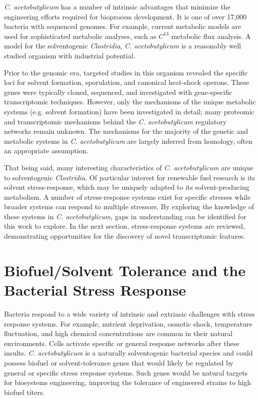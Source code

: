 \textit{C. acetobutylicum} has a number of intrinsic advantages that minimize the engineering efforts required for bioprocess development. It is one of over 17,000 bacteria with sequenced genomes.\cite{89,90,91} For example, current metabolic models\cite{100} are used for sophisticated metabolic analyses, such as $C^{13}$ metabolic flux analysis.\cite{99} A model for the solventogenic \textit{Clostridia}, \textit{C. acetobutylicum} is a reasonably well studied organism with industrial potential.

Prior to the genomic era, targeted studies in this organism revealed the specific loci for solvent formation,\cite{62,63,64,66,68,72,73} sporulation,\cite{125} and canonical heat-shock operons.\cite{76,80} These genes were typically cloned, sequenced, and investigated with gene-specific transcriptomic techniques. However, only the mechanisms of the unique metabolic systems (e.g. solvent formation) have been investigated in detail; many proteomic and transcriptomic mechanisms behind the \textit{C. acetobutylicum} regulatory networks remain unknown.\cite{126,42} The mechanisms for the majority of the genetic and metabolic systems in \textit{C. acetobutylicum} are largely inferred from homology, often an appropriate assumption.

That being said, many interesting characteristics of \textit{C. acetobutylicum} are unique to solventogenic \textit{Clostridia}. Of particular interest for renewable fuel research is its solvent stress-response, which may be uniquely adapted to its solvent-producing metabolism. A number of stress-response systems exist for specific stresses while broader systems can respond to multiple stressors. By exploring the knowledge of these systems in \textit{C. acetobutylicum}, gaps in understanding can be identified for this work to explore. In the next section, stress-response systems are reviewed, demonstrating opportunities for the discovery of novel transcriptomic features.

\section{Biofuel/Solvent Tolerance and the Bacterial Stress Response}


Bacteria respond to a wide variety of intrinsic and extrinsic challenges with stress response systems.\cite{11,24,77} For example, nutrient deprivation, osmotic shock, temperature fluctuation, and high chemical concentrations are common in their natural environments.\cite{11} Cells activate specific or general response networks after these insults. \textit{C. acetobutylicum} is a naturally solventogenic bacterial species and could possess biofuel or solvent-tolerance genes that would likely be regulated by general or specific stress response systems. Such genes would be natural targets for biosystems engineering, improving the tolerance of engineered strains to high biofuel titers. 

